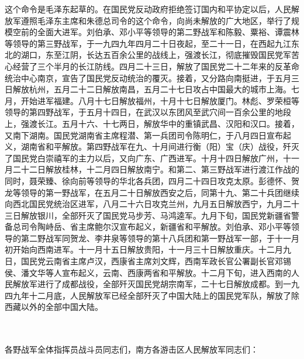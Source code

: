 \documentclass[cn,11pt,chinese]{elegantbook}
\begin{document}
\begin{introduction}
\item 这个命令是毛泽东起草的。在国民党反动政府拒绝签订国内和平协定以后，人民解放军遵照毛泽东主席和朱德总司令的这个命令，向尚未解放的广大地区，举行了规模空前的全面大进军。刘伯承、邓小平等领导的第二野战军和陈毅、粟裕、谭震林等领导的第三野战军，于一九四九年四月二十日夜起，至二十一日，在西起九江东北的湖口，东至江阴，长达五百余公里的战线上，强渡长江，彻底摧毁国民党军苦心经营了三个半月的长江防线。四月二十三日，解放了国民党二十二年来的反革命统治中心南京，宣告了国民党反动统治的覆灭。接着，又分路向南挺进，于五月三日解放杭州，五月二十二日解放南昌，五月二十七日攻占中国最大的城市上海。七月，开始进军福建。八月十七日解放福州，十月十七日解放厦门。林彪、罗荣桓等领导的第四野战军，于五月十四日，在武汉以东团风至武穴间一百余公里的地段上，强渡长江。五月十六、十七两日，解放华中的重镇武昌、汉阳和汉口。接着，又南下湖南。国民党湖南省主席程潜、第一兵团司令陈明仁，于八月四日宣布起义，湖南省和平解放。第四野战军在九、十月间进行衡（阳）宝（庆）战役，歼灭了国民党白崇禧军的主力以后，又向广东、广西进军。十月十四日解放广州，十一月二十二日解放桂林，十二月四日解放南宁。和第二、第三野战军进行渡江作战的同时，聂荣臻、徐向前等领导的华北各兵团，四月二十四日攻克太原。彭德怀、贺龙等领导的第一野战军，在五月二十日解放西安之后，同第十九、第二十兵团继续向西北国民党统治区进军，八月二十六日攻克兰州，九月五日解放西宁，九月二十三日解放银川，全部歼灭了国民党马步芳、马鸿逵军。九月下旬，国民党新疆省警备总司令陶峙岳、省主席鲍尔汉宣布起义，新疆省和平解放。刘伯承、邓小平等领导的第二野战军同贺龙、李井泉等领导的第十八兵团和第一野战军一部，于十一月初开始向西南进军。十一月十五日解放贵阳，十一月三十日解放重庆。十二月九日，国民党云南省主席卢汉，西康省主席刘文辉，西南军政长官公署副长官邓锡侯、潘文华等人宣布起义，云南、西康两省和平解放。十二月下旬，进入西南的人民解放军进行了成都战役，全部歼灭国民党胡宗南军，二十七日解放成都。到一九四九年十二月底，人民解放军已经全部歼灭了中国大陆上的国民党军队，解放了除西藏以外的全部中国大陆。
\end{introduction}\\~\\
各野战军全体指挥员战斗员同志们，南方各游击区人民解放军同志们：\\
\end{document}

